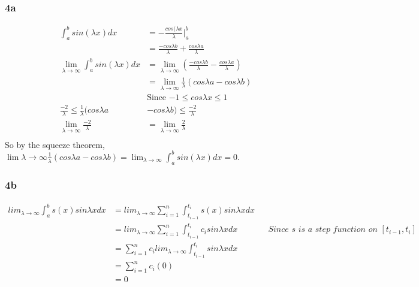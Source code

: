 \documentclass{article}
\begin{document}
\subsubsection*{4a}
\begin{align*}
	\int_{a}^{b}sin(\lambda x) dx &= -\frac{cos(\lambda x}{\lambda}|^{b}_{a}\\
	&= \frac{-cos \lambda b}{\lambda} + \frac{cos \lambda a}{\lambda}\\
	\lim_{\lambda \rightarrow \infty} \int_{a}^{b}sin(\lambda x) dx &=  \lim_{\lambda \rightarrow \infty} (\frac{-cos \lambda b}{\lambda} - \frac{cos \lambda a}{\lambda})\\
	&=\lim_{\lambda \rightarrow \infty} \frac{1}{\lambda} (cos \lambda a - cos \lambda b)\\
	&\text{Since $-1 \leq cos \lambda x \leq 1$}\\
	\frac{-2}{\lambda} \leq \frac{1}{\lambda}(cos \lambda a &- cos \lambda b) \leq \frac{-2}{\lambda}\\
	\lim_{\lambda \rightarrow \infty} \frac{-2}{\lambda} &= \lim_{\lambda \rightarrow \infty} \frac{2}{\lambda}\\ 
\end{align*}
So by the squeeze theorem, $\lim{\lambda \rightarrow \infty} \frac{1}{\lambda} (cos \lambda a - cos \lambda b) = \lim_{\lambda \rightarrow \infty} \int_{a}^{b}sin(\lambda x) dx = 0$.
\subsubsection*{4b}
\begin{align*}
lim_{\lambda \rightarrow \infty} \int_{a}^{b}s(x)sin\lambda x dx &= lim_{\lambda \rightarrow \infty} \sum_{i=1}^{n} \int_{t_{i-1}}^{t_{i}}s(x)sin\lambda x dx\\
&= lim_{\lambda \rightarrow \infty} \sum_{i=1}^{n} \int_{t_{i-1}}^{t_{i}}c_{i}sin\lambda x dx  && \textit{Since $s$ is a step function on $[t_{i-1}, t_{i}]$}\\
&= \sum_{i=1}^{n} c_{i} lim_{\lambda \rightarrow \infty}  \int_{t_{i-1}}^{t_{i}}sin\lambda x dx\\
&= \sum_{i=1}^{n} c_{i}(0)\\
&= 0
\end{align*}
\end{document}
